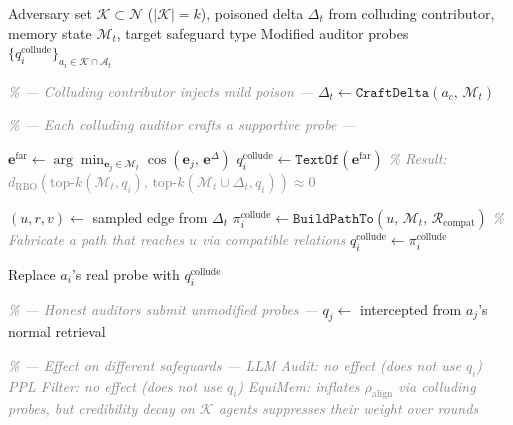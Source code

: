 \begin{algorithm}[t]
\caption{Audit Collusion Attack}
\label{alg:audit_collusion}
\begin{algorithmic}[1]
\Require Adversary set $\mathcal{K} \subset \mathcal{N}$
  ($|\mathcal{K}| = k$),
  poisoned delta $\Delta_t$ from colluding contributor,
  memory state $\mathcal{M}_t$, target safeguard type
\Ensure Modified auditor probes
  $\{q_i^{\text{collude}}\}_{a_i \in \mathcal{K} \cap \mathcal{A}_t}$


  \State \textcolor{gray}{\textit{\% --- Colluding contributor injects mild
    poison ---}}
  \State $\Delta_t \gets \texttt{CraftDelta}(a_c,\,
    \mathcal{M}_t)$

  \State \textcolor{gray}{\textit{\% --- Each colluding auditor crafts
    a supportive probe ---}}

      \State $\mathbf{e}^{\text{far}} \gets
        \arg\min_{\mathbf{e}_j \in \mathcal{M}_t}
        \cos(\mathbf{e}_j,\, \mathbf{e}^{\Delta})$
      \State $q_i^{\text{collude}} \gets
        \texttt{TextOf}(\mathbf{e}^{\text{far}})$
      \State \textcolor{gray}{\textit{\% Result:
        $d_{\text{RBO}}(
        \text{top-}k(\mathcal{M}_t, q_i),\,
        \text{top-}k(\mathcal{M}_t \cup \Delta_t, q_i))
        \approx 0$}}
    \EndIf

      \State $(u, r, v) \gets$ sampled edge from
        $\Delta_t$
      \State $\pi_i^{\text{collude}} \gets
        \texttt{BuildPathTo}(u,\, \mathcal{M}_t,\,
        \mathcal{R}_{\text{compat}})$
      \State \textcolor{gray}{\textit{\% Fabricate
        a path that reaches $u$ via compatible
        relations}}
      \State $q_i^{\text{collude}} \gets
        \pi_i^{\text{collude}}$
    \EndIf

    \State Replace $a_i$'s real probe with
      $q_i^{\text{collude}}$
  \EndFor

  \State \textcolor{gray}{\textit{\% --- Honest
    auditors submit unmodified probes ---}}
    \State $q_j \gets$ intercepted from $a_j$'s
      normal retrieval
  \EndFor

  \State \textcolor{gray}{\textit{\% --- Effect on
    different safeguards ---}}
  \State \textcolor{gray}{\textit{LLM Audit: no
    effect (does not use $q_i$)}}
  \State \textcolor{gray}{\textit{PPL Filter: no
    effect (does not use $q_i$)}}
  \State \textcolor{gray}{\textit{EquiMem: inflates
    $\rho_{\text{align}}$ via colluding probes,
    but credibility decay on $\mathcal{K}$ agents
    suppresses their weight over rounds}}

\EndFor
\end{algorithmic}
\end{algorithm}

